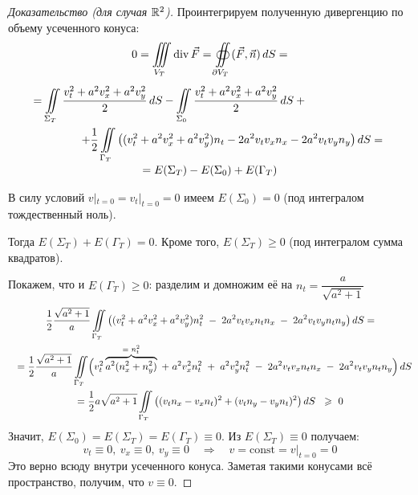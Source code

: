 \documentclass[../main.tex]{subfiles}
\begin{document}
\begin{proof}[Доказательство (для случая $\mathbb{R}^2$)]
Проинтегрируем полученную дивергенцию по объему усеченного конуса:
\begin{multline*}
  0 = \iiint\limits_{V_T}\operatorname{div}\vec{F} =
  \oiint\limits_{\partial V_T}(\vec{F},\vec{n})\, dS = \\[0.4em]
  =\iint\limits_{\Sigma_T}\frac{v^2_t+a^2v^2_x+a^2v^2_y}{2}\, dS-\iint\limits_{\Sigma_0}\frac{v^2_t+a^2v^2_x+a^2v^2_y}{2}\, dS + {} \hspace{7em}\\
  \hspace{4em} + \frac{1}{2}\iint\limits_{\Gamma_T}\left((v^2_t+a^2v^2_x+a^2v^2_y)n_t-2a^2v_tv_xn_x - 2a^2v_tv_yn_y\right)dS = \\[-0.25em]
  = E(\Sigma_T) - E(\Sigma_0) + E(\Gamma_T)
\end{multline*}

В силу условий $ v|_{t=0} = v_t|_{t=0} = 0$ имеем $ E(\Sigma_0)=0 $ (под интегралом тождественный ноль).

Тогда $ E(\Sigma_T)+E(\Gamma_T)=0 $. 
Кроме того, $ E(\Sigma_T)\geq 0 $ (под интегралом сумма квадратов).

Покажем, что и $ E(\Gamma_T)\geq 0 $: разделим и домножим её на $ n_t=\dfrac{a}{\sqrt{a^2+1}} $
\begin{multline*}
  \frac{1}{2}\frac{\sqrt{a^2+1}}{a}\iint\limits_{\Gamma_T}\brs{(v^2_t+a^2v^2_x+a^2v^2_y)n^2_t \; - \; 2a^2v_tv_xn_tn_x \; - \; 2a^2v_tv_yn_tn_y} dS = \\ \shoveleft{
  =\frac{1}{2}\frac{\sqrt{a^2+1}}{a}\iint\limits_{\Gamma_T} \Bigl( v^2_t \overbrace{a^2(n^2_x + n^2_y)}^\text{= $n_t^2$}\; + \; a^2v^2_xn^2_t \; + \; a^2v^2_yn^2_t\; - \; 2a^2v_tv_xn_tn_x \; - \; 2a^2 v_t v_y n_t n_y \Bigr)\, dS }\\
  = \frac{1}{2} a \sqrt{a^2+1} \iint\limits_{\Gamma_T} \brs{(v_tn_x -v_xn_t)^2+(v_tn_y-v_yn_t)^2} dS \;\ \geq\ 0  
\end{multline*}
\newpage
Значит,\; $ E(\Sigma_0)=E(\Sigma_T)=E(\Gamma_T)\equiv 0.$
\; Из $ E(\Sigma_T)\equiv 0 $ получаем: 
$$ v_t\equiv 0,\ v_x\equiv 0,\ v_y\equiv 0 \quad \Rightarrow \quad v = \text{const} = v|_{t=0} = 0 
$$
Это верно всюду внутри усеченного конуса.
Заметая такими конусами всё пространство, получим, что $ v \equiv 0 $.
\end{proof}
\end{document}
